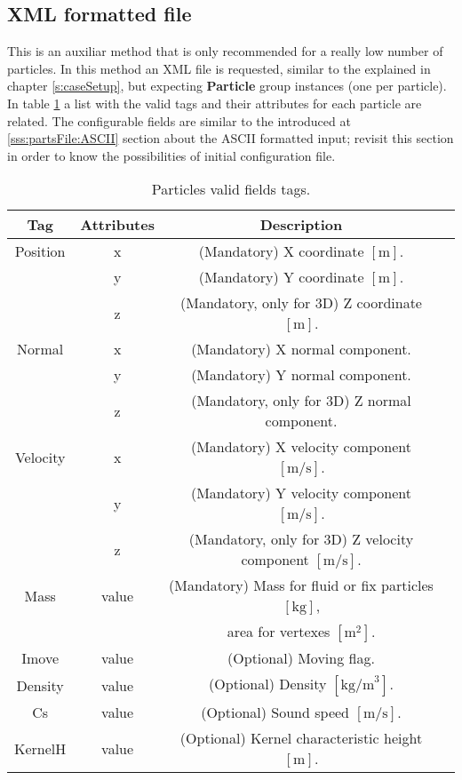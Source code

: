 \subsection{XML formatted file}
\label{sss:partsFile:XML}
%
This is an auxiliar method that is only recommended for a really
low number of particles. In this method an XML file is requested,
similar to the explained in chapter \ref{s:caseSetup}, but
expecting \textbf{Particle} group instances (one per particle).\rc
%
In table \ref{tables:caseSetup:PartInput:Options} a list with the
valid tags and their attributes for each particle are related. The
configurable fields are similar to the introduced at
\ref{sss:partsFile:ASCII} section about the ASCII formatted input;
revisit this section in order to know the possibilities of initial
configuration file.
%
\begin{table}[h!b!p!]\small
	\centering
	\begin{tabular}{| c | c | c | l | }
		\hline
		\cellcolor[rgb]{0.7,0.7,0.7}Tag & \cellcolor[rgb]{0.7,0.7,0.7}Attributes & \cellcolor[rgb]{0.7,0.7,0.7}Description \\
		\hline
		Position & x     & (Mandatory) X coordinate $[\mbox{m}]$. \\
		         & y     & (Mandatory) Y coordinate $[\mbox{m}]$. \\
		         & z     & (Mandatory, only for 3D) Z coordinate $[\mbox{m}]$. \\
		\hline
		Normal   & x     & (Mandatory) X normal component. \\
		         & y     & (Mandatory) Y normal component. \\
		         & z     & (Mandatory, only for 3D) Z normal component. \\
		\hline
		Velocity & x     & (Mandatory) X velocity component $[\mbox{m/s}]$. \\
		         & y     & (Mandatory) Y velocity component $[\mbox{m/s}]$. \\
		         & z     & (Mandatory, only for 3D) Z velocity component $[\mbox{m/s}]$. \\
		\hline
		Mass     & value & (Mandatory) Mass for fluid or fix particles $[\mbox{kg}]$, \\
		         &       & area for vertexes $[\mbox{m}^2]$. \\
		\hline
		Imove    & value & (Optional) Moving flag. \\
		\hline
		Density  & value & (Optional) Density $[\mbox{kg/m}^3]$. \\
		\hline
		Cs       & value & (Optional) Sound speed $[\mbox{m/s}]$. \\
		\hline
		KernelH  & value & (Optional) Kernel characteristic height $[\mbox{m}]$. \\
		\hline
	\end{tabular}
	\caption{Particles valid fields tags.}
	\label{tables:caseSetup:PartInput:Options}
\end{table}
%
